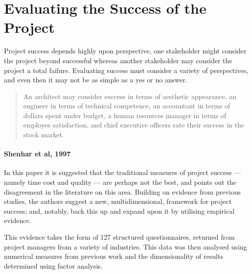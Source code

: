 \section{Evaluating the Success of the Project}

Project success depends highly upon perspective, one stakeholder might consider the project beyond successful whereas another stakeholder may consider the project a total failure. Evaluating success must consider a variety of perspectives, and even then it may not be as simple as a yes or no answer. 

\begin{quote}
An architect may consider success in terms of aesthetic appearance, an engineer in terms of technical competence, an accountant in terms of dollars spent under budget, a human resources manager in terms of employee satisfaction, and chief executive officers rate their success in the stock market.
\end{quote}

\paragraph{Shenhar et al, 1997} \cite{shenhar} In this paper it is suggested that the traditional measures of project success --- namely time cost and quality --- are perhaps not the best, and points out the disagreement in the literature on this area. Building on evidence from previous studies, the authors suggest a new, multidimensional, framework for project success; and, notably, back this up and expand upon it by utilising empirical evidence.

This evidence takes the form of 127 structured questionnaires, returned from project managers from a variety of industries. This data was then analysed using numerical measures from previous work and the dimensionality of results determined using factor analysis.

